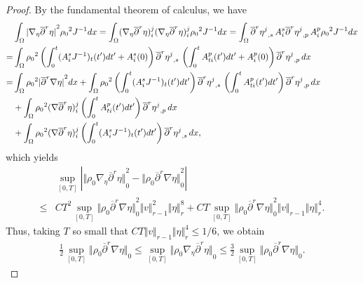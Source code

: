 \documentclass[12pt,twoside,reqno]{amsart}
\numberwithin{equation}{section}
\theoremstyle{definition}
\theoremstyle{remark}
\begin{document}
\begin{proof}
By the fundamental theorem of calculus, we have
\begin{align*}
  &\int_\Omega {\vert{{\nabla}_\eta {\overline{\partial}}^r\eta}\vert}^2{\rho_0}^2  J^{-1}dx
  =\int_\Omega ({\nabla}_\eta {\overline{\partial}}^r\eta)_i^j({\nabla}_\eta {\overline{\partial}}^r\eta)_i^j{\rho_0}^2  J^{-1}dx
  =\int_\Omega {\overline{\partial}}^r{{{\eta^j}}_{,{s}}\,}A^s_i{\overline{\partial}}^r{{{\eta^j}}_{,{p}}\,}A^p_i{\rho_0}^2  J^{-1}dx{\nonumber}\\
  =&\int_\Omega {\rho_0}^2 \left(\int_0^t (A^s_i J^{-1})_t(t')dt'+A^s_i(0)\right){\overline{\partial}}^r{{{\eta^j}}_{,{s}}\,} \left(\int_0^t A^p_{ti}(t')dt'+A^p_i(0)\right){\overline{\partial}}^r{{{\eta^j}}_{,{p}}\,}dx{\nonumber}\\
  =&\int_\Omega {\rho_0}^2 {\vert{{\overline{\partial}}^r{\nabla}\eta}\vert}^2dx+\int_\Omega {\rho_0}^2 \left(\int_0^t (A^s_i J^{-1})_t(t')dt'\right){\overline{\partial}}^r{{{\eta^j}}_{,{s}}\,}\left(\int_0^t A^p_{ti}(t')dt'\right){\overline{\partial}}^r{{{\eta^j}}_{,{p}}\,}dx{\nonumber}\\
  &+\int_\Omega {\rho_0}^2 ({\nabla}{\overline{\partial}}^r\eta)_i^j\left(\int_0^t A^p_{ti}(t')dt'\right){\overline{\partial}}^r{{{\eta^j}}_{,{p}}\,}dx\\
  &+\int_\Omega {\rho_0}^2 ({\nabla}{\overline{\partial}}^r\eta)_i^j\left(\int_0^t (A^s_i J^{-1})_t(t')dt'\right){\overline{\partial}}^r{{{\eta^j}}_{,{s}}\,}dx,
\end{align*}
which yields
\begin{align*}
  &\sup_{[0,T]}{\left\vert{{\Vert{{\rho_0} {\nabla}_\eta{\overline{\partial}}^r \eta}\Vert}_0^2-{\Vert{{\rho_0} {\overline{\partial}}^r{\nabla} \eta}\Vert}_0^2}\right\vert}\\
  {\leqslant} &CT^2\sup_{[0,T]}{\Vert{{\rho_0} {\overline{\partial}}^r{\nabla} \eta}\Vert}_0^2{\Vert{v}\Vert}_{r-1}^2{\Vert{\eta}\Vert}_r^8+CT\sup_{[0,T]}{\Vert{{\rho_0} {\overline{\partial}}^r{\nabla} \eta}\Vert}_0^2{\Vert{v}\Vert}_{r-1}{\Vert{\eta}\Vert}_r^4.
\end{align*}
Thus, taking $T$ so small that $CT{\Vert{v}\Vert}_{r-1}{\Vert{\eta}\Vert}_r^4{\leqslant} 1/6$, we obtain
\begin{align}\label{eq.nbeta4}
  \frac{1}{2}\sup_{[0,T]}{\Vert{{\rho_0} {\overline{\partial}}^r{\nabla} \eta}\Vert}_0{\leqslant} \sup_{[0,T]}{\Vert{{\rho_0} {\nabla}_\eta{\overline{\partial}}^r \eta}\Vert}_0{\leqslant} \frac{3}{2}\sup_{[0,T]}{\Vert{{\rho_0} {\overline{\partial}}^r{\nabla} \eta}\Vert}_0.
\end{align}


\end{proof}
\end{document}
